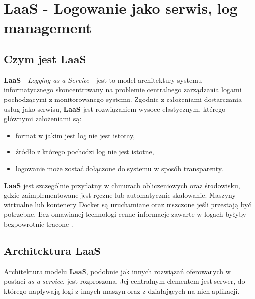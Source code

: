 \section{\textbf{LaaS} - Logowanie jako serwis, log management}
\label{chapter:monitoring_architecture:laas}

    \subsection{Czym jest \textbf{LaaS}}
    \textbf{LaaS} - \textit{Logging as a Service} - jest to model architektury systemu informatycznego
    skoncentrowany na problemie centralnego zarządzania logami pochodzącymi z monitorowanego systemu.
    Zgodnie z założeniami dostarczania usług jako serwisu, \textbf{LaaS} jest rozwiązaniem
    wysoce elastycznym, którego głównymi założeniami są:
    \begin{itemize}
        \item format w jakim jest log nie jest istotny,
        \item źródło z którego pochodzi log nie jest istotne,
        \item logowanie może zostać dołączone do systemu w sposób transparenty.
    \end{itemize}
    
    \textbf{LaaS} jest szczególnie przydatny w chmurach obliczeniowych oraz
    środowisku, gdzie zaimplementowane jest ręczne lub automatycznie skalowanie.
    Maszyny wirtualne lub kontenery Docker są uruchamiane oraz niszczone jeśli
    przestają być potrzebne. Bez omawianej technologi cenne informacje zawarte w logach
    byłyby bezpowrotnie tracone \cite{log_management_explained}. 
    
    \subsection{Architektura LaaS}
    Architektura modelu \textbf{LaaS}, podobnie jak innych rozwiązań oferowanych w postaci \textit{as a service},
    jest rozproszona. Jej centralnym elementem jest serwer, do którego napływają logi
    z innych maszyn oraz z działających na nich aplikacji.
    
